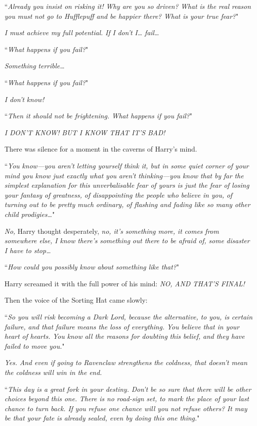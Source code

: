 ``\emph{Already you insist on risking it! Why are you so driven? What is the real reason you must not go to Hufflepuff and \emph{be happier} there? What is your true fear?}"

\emph{I must achieve my full potential. If I don't I{\ldots} fail{\ldots}}

``\emph{What happens if you fail?}"

\emph{Something terrible{\ldots}}

``\emph{What happens if you fail?}"

\emph{I don't know!}

``\emph{Then it should not be frightening. What happens if you fail?}"

\emph{I DON'T KNOW! BUT I KNOW THAT IT'S BAD!}

There was silence for a moment in the caverns of Harry's mind.

``\emph{You know—you aren't letting yourself think it, but in some quiet corner of your mind you know just exactly \emph{what} you aren't thinking—you \emph{know} that by far the simplest explanation for this unverbalisable fear of yours is just the fear of losing your fantasy of greatness, of disappointing the people who believe in you, of turning out to be pretty much ordinary, of flashing and fading like so many other child prodigies{\ldots}}"

\emph{No,} Harry thought desperately, \emph{no, it's something more, it comes from somewhere else, I know there's something out there to be afraid of, some disaster I have to stop{\ldots}}

``\emph{How could you possibly know about something like that?}"

Harry screamed it with the full power of his mind: \emph{NO, AND THAT'S FINAL!}

Then the voice of the Sorting Hat came slowly:

``\emph{So you will risk becoming a Dark Lord, because the alternative, to you, is certain failure, and that failure means the loss of everything. You believe that in your heart of hearts. You know all the reasons for doubting this belief, and they have failed to move you.}"

\emph{Yes. And even if going to Ravenclaw \emph{strengthens} the coldness, that doesn't mean the coldness will \emph{win} in the end.}

``\emph{This day is a great fork in your destiny. Don't be so sure that there will be other choices beyond this one. There is no road-sign set, to mark the place of your \emph{last} chance to turn back. If you refuse one chance will you not refuse others? It may be that your fate is already sealed, even by doing this one thing.}"

